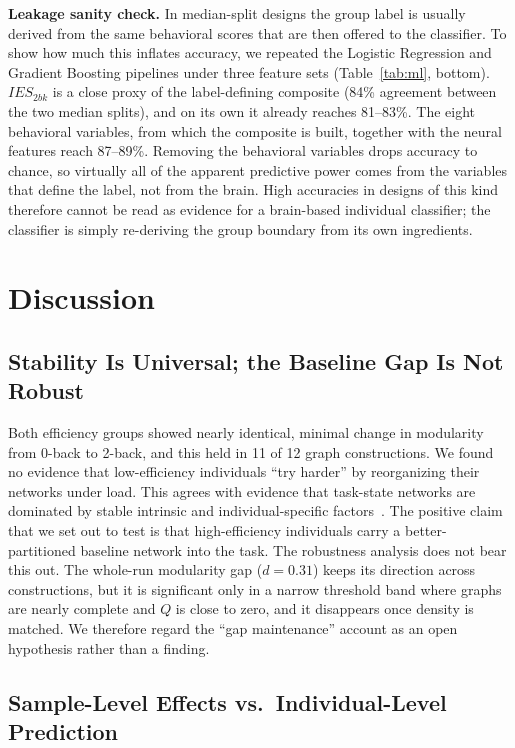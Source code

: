 \documentclass[conference]{IEEEtran}
\begin{document}
\textbf{Leakage sanity check.} In median-split designs the group label is usually derived from the same behavioral scores that are then offered to the classifier. To show how much this inflates accuracy, we repeated the Logistic Regression and Gradient Boosting pipelines under three feature sets (Table~\ref{tab:ml}, bottom). $IES_{2bk}$ is a close proxy of the label-defining composite (84\% agreement between the two median splits), and on its own it already reaches 81--83\%. The eight behavioral variables, from which the composite is built, together with the neural features reach 87--89\%. Removing the behavioral variables drops accuracy to chance, so virtually all of the apparent predictive power comes from the variables that define the label, not from the brain. High accuracies in designs of this kind therefore cannot be read as evidence for a brain-based individual classifier; the classifier is simply re-deriving the group boundary from its own ingredients.




\section{Discussion}

\subsection{Stability Is Universal; the Baseline Gap Is Not Robust}

Both efficiency groups showed nearly identical, minimal change in modularity from 0-back to 2-back, and this held in 11 of 12 graph constructions. We found no evidence that low-efficiency individuals ``try harder'' by reorganizing their networks under load. This agrees with evidence that task-state networks are dominated by stable intrinsic and individual-specific factors~\cite{cole2014intrinsic,cole2021functional,gratton2018functional}. The positive claim that we set out to test is that high-efficiency individuals carry a better-partitioned baseline network into the task. The robustness analysis does not bear this out. The whole-run modularity gap ($d=0.31$) keeps its direction across constructions, but it is significant only in a narrow threshold band where graphs are nearly complete and $Q$ is close to zero, and it disappears once density is matched. We therefore regard the ``gap maintenance'' account as an open hypothesis rather than a finding.

\subsection{Sample-Level Effects vs.\ Individual-Level Prediction}
\end{document}
